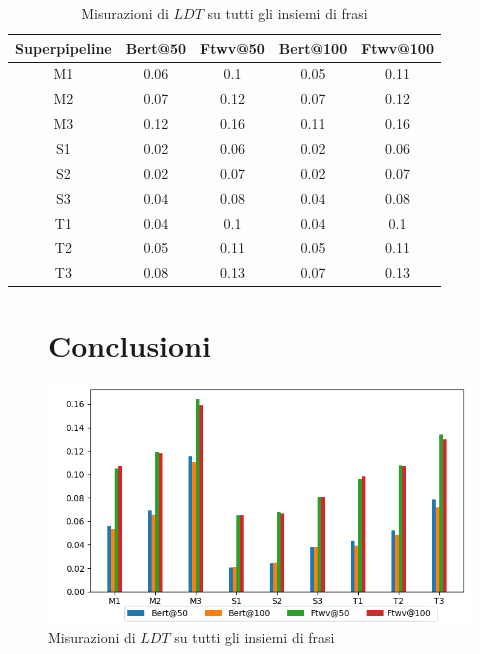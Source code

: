 \begin{table}[H]
\centering
\begin{tabular}{c|cc|cc}
\textbf{Superpipeline} & \textbf{Bert@50} &  \textbf{Ftwv@50} & \textbf{Bert@100} & \textbf{Ftwv@100}\\
\hline
M1& 0.06& 0.1& 0.05& 0.11\\
M2& 0.07& 0.12& 0.07& 0.12\\
M3& 0.12& 0.16& 0.11& 0.16\\
S1& 0.02& 0.06& 0.02& 0.06\\
S2& 0.02& 0.07& 0.02& 0.07\\
S3& 0.04& 0.08& 0.04& 0.08\\
T1& 0.04& 0.1& 0.04& 0.1\\
T2& 0.05& 0.11& 0.05& 0.11\\
T3& 0.08& 0.13& 0.07& 0.13\\
\end{tabular}
\caption{Misurazioni di $LDT$ su tutti gli insiemi di frasi}
\label{fig:test_res_ldt_gra}
\end{table}

\begin{figure}[H]

\section{Conclusioni}
\centering
\includegraphics[width=\textwidth]{immagini/test/ldt}
\caption{Misurazioni di $LDT$ su tutti gli insiemi di frasi}
\label{fig:test_res_ldt}
\end{figure}












